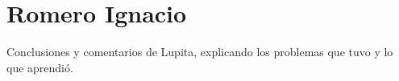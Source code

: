 \section{Romero Ignacio}
Conclusiones y comentarios de Lupita, explicando los problemas que tuvo y lo que aprendió.
